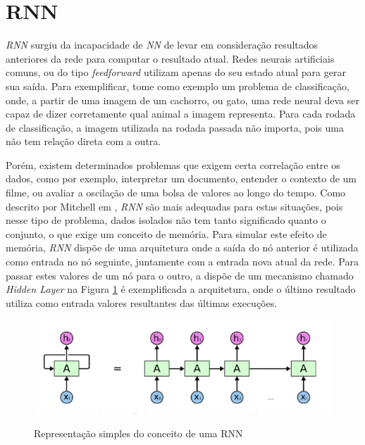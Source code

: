 

\section{\acrfull{RNN}}




\textit{\acrshort{RNN}} surgiu da incapacidade de \textit{\acrfull{NN}} de levar em consideração resultados anteriores da rede para computar o resultado atual. Redes neurais artificiais comuns, ou do tipo \textit{feedforward} utilizam apenas do seu estado atual para gerar sua saída. Para exemplificar, tome como exemplo um problema de classificação, onde, a partir de uma imagem de um cachorro, ou gato, uma rede neural deva ser capaz de dizer corretamente qual animal a imagem representa. Para cada rodada de classificação, a imagem utilizada na rodada passada não importa, pois uma não tem relação direta com a outra. 

Porém, existem determinados problemas que exigem certa correlação entre os dados, como por exemplo, interpretar um documento, entender o contexto de um filme, ou avaliar a oscilação de uma bolsa de valores ao longo do tempo. Como descrito por Mitchell em \cite{Mitchell_1997}, \textit{\acrshort{RNN}} são mais adequadas para estas situações, pois nesse tipo de problema, dados isolados não tem tanto significado quanto o conjunto, o que exige um conceito de memória. Para simular este efeito de memória, \textit{\acrshort{RNN}} dispõe de uma arquitetura onde a saída do nó anterior é utilizada como entrada no nó seguinte, juntamente com a entrada nova atual da rede. Para passar estes valores de um nó para o outro, a  dispõe de um mecanismo chamado \textit{Hidden Layer} na Figura \ref{figure:rnn} é exemplificada a arquitetura, onde o último resultado utiliza como entrada valores resultantes das últimas execuções.

\begin{figure}[htbp]
    \centering
    \includegraphics[scale=0.4]{monography/img/models/rnnExample.png}
    \label{figure:rnn}
    \caption[Representação simples do conceito de um RNN]{Representação simples do conceito de uma RNN \footnotemark}
\end{figure}

